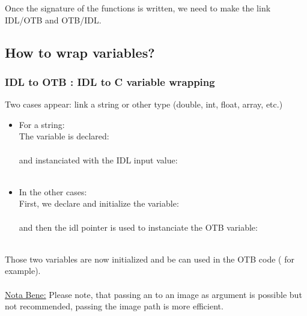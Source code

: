 Once the signature of the functions is written, we need to make the link IDL/OTB and OTB/IDL.

\subsection{How to wrap variables?}
\subsubsection{IDL to OTB : IDL to C variable wrapping}
Two cases appear: link a string or other type (double, int, float, array, etc.)

\begin{itemize}
\item For a string:\\
  The variable is declared:\\ 
  \\
  and instanciated with the IDL input value:\\ \\
\item In the other cases:\\
  First, we declare and initialize the variable:\\ \\
  and then the idl pointer is used to instanciate the OTB variable:\\ \\
\end{itemize}
Those two variables are now initialized and be can used in the OTB code ( for example).
\\
\\
\underline{Nota Bene:} Please note, that passing an  to an image as argument is possible but not recommended, passing the image path is more efficient.

